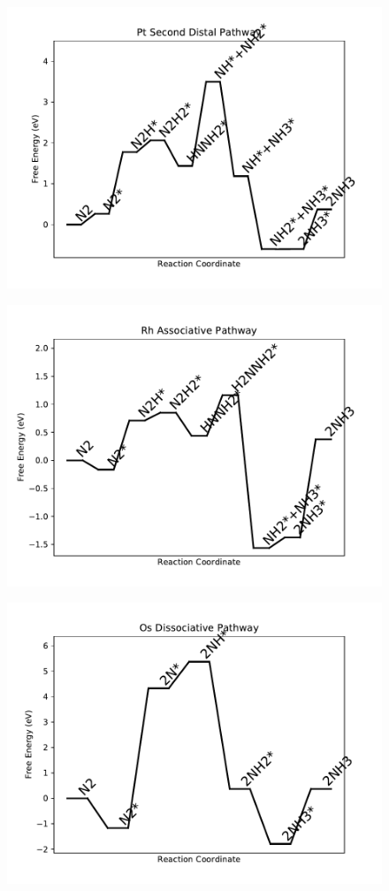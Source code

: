 \begin{figure}
\centering
\includegraphics[width=0.8\linewidth]{data/plots/Pt_distal_2.pdf}
\end{figure}

\begin{figure}
\centering
\includegraphics[width=0.8\linewidth]{data/plots/Rh_associative.pdf}
\end{figure}

\begin{figure}
\centering
\includegraphics[width=0.8\linewidth]{data/plots/Os_dissociative.pdf}
\end{figure}

